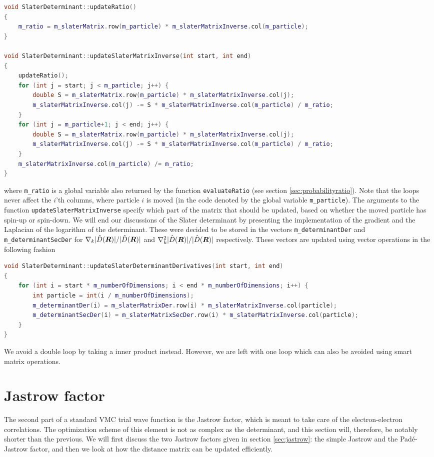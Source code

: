 \begin{lstlisting}[language={c++}]
void SlaterDeterminant::updateRatio()
{
	m_ratio = m_slaterMatrix.row(m_particle) * m_slaterMatrixInverse.col(m_particle);
}

void SlaterDeterminant::updateSlaterMatrixInverse(int start, int end)
{
	updateRatio();
	for (int j = start; j < m_particle; j++) {
		double S = m_slaterMatrix.row(m_particle) * m_slaterMatrixInverse.col(j);
		m_slaterMatrixInverse.col(j) -= S * m_slaterMatrixInverse.col(m_particle) / m_ratio;
	}
	for (int j = m_particle+1; j < end; j++) {
		double S = m_slaterMatrix.row(m_particle) * m_slaterMatrixInverse.col(j);
		m_slaterMatrixInverse.col(j) -= S * m_slaterMatrixInverse.col(m_particle) / m_ratio;
	}
	m_slaterMatrixInverse.col(m_particle) /= m_ratio;
}
\end{lstlisting}
where \lstinline{m_ratio} is a global variable also returned by the function \lstinline{evaluateRatio} (see section \ref{sec:probabilityratio}). Note that the loops never affect the $i$'th columns, where particle $i$ is moved (in the code denoted by the global variable \lstinline{m_particle}). The arguments to the function \lstinline{updateSlaterMatrixInverse} specify which part of the matrix that should be updated, based on whether the moved particle has spin-up or spin-down. We will end our discussions of the Slater determinant by presenting the implementation of the gradient and the Laplacian of the logarithm of the determinant. These were decided to be stored in the vectors \lstinline{m_determinantDer} and \lstinline{m_determinantSecDer} for $\nabla_k|\hat{D}(\boldsymbol{{R}})|/|\hat{D}(\boldsymbol{{R}})|$ and $\nabla_k^2|\hat{D}(\boldsymbol{{R}})|/|\hat{D}(\boldsymbol{{R}})|$ respectively. These vectors are updated using vector operations in the following fashion
\begin{lstlisting}[language={c++}]
void SlaterDeterminant::updateSlaterDeterminantDerivatives(int start, int end)
{
	for (int i = start * m_numberOfDimensions; i < end * m_numberOfDimensions; i++) {
		int particle = int(i / m_numberOfDimensions);
		m_determinantDer(i) = m_slaterMatrixDer.row(i) * m_slaterMatrixInverse.col(particle);
		m_determinantSecDer(i) = m_slaterMatrixSecDer.row(i) * m_slaterMatrixInverse.col(particle);
	}
}
\end{lstlisting}
We avoid a double loop by taking a inner product instead. However, we are left with one loop which can also be avoided using smart matrix operations.

\section{Jastrow factor}
The second part of a standard VMC trial wave function is the Jastrow factor, which is meant to take care of the electron-electron correlations. The optimization scheme of this element is not as complex as the determinant, and this section will, therefore, be notably shorter than the previous. We will first discuss the two Jastrow factors given in section \ref{sec:jastrow}: the simple Jastrow and the Padé-Jastrow factor, and then we look at how the distance matrix can be updated efficiently. 


